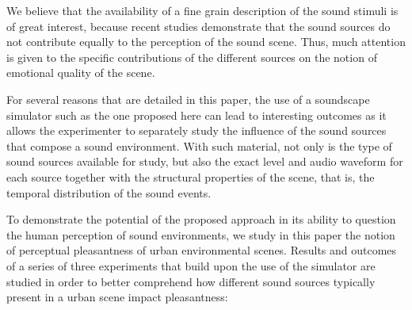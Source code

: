 \documentclass[12pt]{elsarticle}
\providecommand{\DIFadd}[1]{{\protect\color{blue}\uwave{#1}}} %
\providecommand{\DIFaddbegin}{} %
\providecommand{\DIFaddend}{} %
\begin{document}
We believe that the availability of a fine grain description of the sound stimuli is of great interest, because recent studies demonstrate that the sound sources do not contribute equally to the perception of the sound scene\DIFaddbegin \DIFadd{, see~}\DIFaddend \cite{defreville2004aactivity,lavandier2006contribution,guastavino2006ideal,nilsson2007soundscape,szeremeta2009analysis}. Thus, much attention is given to the specific contributions of the different sources on the notion of emotional quality of the scene\DIFaddbegin \DIFadd{, see~}\DIFaddend \cite{gozalo2015relationship,ricciardi2015sound}.


For several reasons that are detailed in this paper, the use of a soundscape simulator such as the one proposed here can lead to interesting outcomes as it allows the experimenter to separately study  the influence of the sound sources that compose a sound environment. With such material, not only is the type of sound sources available for study, but also the exact \DIFaddbegin \DIFadd{sound }\DIFaddend level and audio waveform for each source together with the structural properties of the scene, that is, the temporal distribution of the sound events.


To demonstrate the potential of the proposed approach in its ability to question the human perception of sound environments, we study in this paper the notion of perceptual pleasantness of urban environmental scenes. Results and outcomes of a series of three experiments that build upon the use of the simulator are studied in order to better comprehend how different sound sources typically present in a urban scene impact pleasantness:
\end{document}
